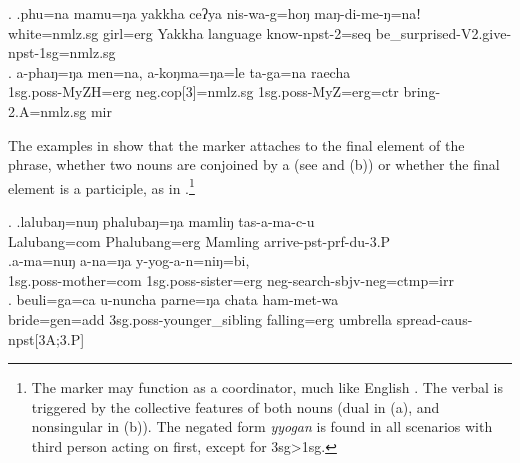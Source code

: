 	\ex. \ag.phu=na mamu=ŋa yakkha ceʔya nis-wa-g=hoŋ maŋ-di-me-ŋ=naǃ\\
	white{\sc =nmlz.sg} girl{\sc =erg} Yakkha language know{\sc -npst-2=seq}  be\_surprised{\sc -V2.give-npst-1sg=nmlz.sg}\\
	\bg. a-phaŋ=ŋa men=na, a-koŋma=ŋa=le   ta-ga=na           raecha\\
		{\sc 1sg.poss-}MyZH{\sc =erg}  {\sc  neg.cop[3]=nmlz.sg} {\sc 1sg.poss-}MyZ{\sc =erg=ctr} bring{\sc [pst;3.P]-2.A=nmlz.sg} {\sc mir}\\
		 

The examples in  \Next show that the  marker attaches to the final element of the phrase,  whether two nouns are conjoined by a  (see \Next[a] and (b)) or whether the final element is a participle, as in \Next[c].\footnote{The  marker may function as a coordinator, much like English . The verbal  is triggered by the collective  features of both nouns (dual in (a), and nonsingular in (b)). The negated form \emph{yyogan} is found in all scenarios with third person acting on first, except for {\sc 3sg>1sg}.}
	
	\ex. \ag.lalubaŋ=nuŋ   phalubaŋ=ŋa   mamliŋ   tas-a-ma-c-u\\
	Lalubang{\sc =com} Phalubang{\sc =erg} Mamling arrive{\sc -pst-prf-du-3.P}\\
	\bg.a-ma=nuŋ  a-na=ŋa  y-yog-a-n=niŋ=bi, \\
	{\sc 1sg.poss-}mother{\sc =com} {\sc 1sg.poss-}sister{\sc =erg} {\sc neg-}search{\sc [3A;1.P]-sbjv-neg=ctmp=irr}\\
	\bg.   beuli=ga=ca  u-nuncha parne=ŋa    chata    ham-met-wa\\
	bride{\sc =gen=add} {\sc 3sg.poss-}younger\_sibling  falling{\sc =erg} umbrella spread{\sc -caus-npst[3A;3.P]}\\

